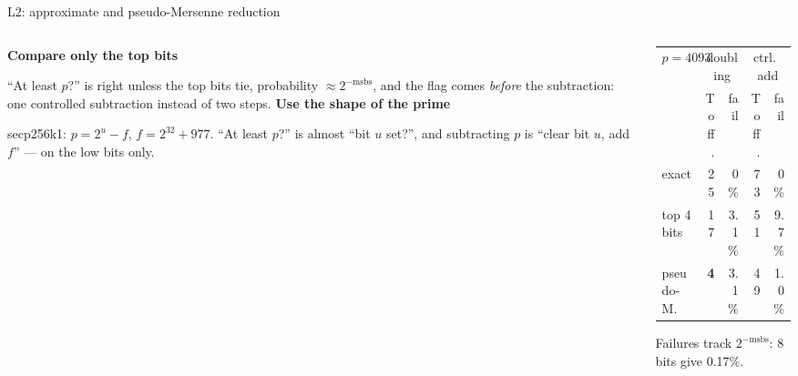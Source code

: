 \documentclass[aspectratio=169,11pt]{beamer}
\newcommand{\blocktitle}[1]{{\bfseries #1}\par\vskip1mm}
\begin{document}
\setcounter{framenumber}{82}
\begin{frame}{L2: approximate and pseudo-Mersenne reduction}
  \begin{columns}[T]
    \begin{column}{0.5\textwidth}
      \small
      \blocktitle{Compare only the top bits}
      ``At least $p$?'' is right unless the top bits tie, probability $\approx2^{-\text{msbs}}$, and the flag comes \emph{before} the subtraction: one controlled subtraction instead of two steps.
      \vskip2mm
      \blocktitle{Use the shape of the prime}
      secp256k1: $p=2^{u}-f$, $f=2^{32}+977$. ``At least $p$?'' is almost ``bit $u$ set?'', and subtracting $p$ is ``clear bit $u$, add $f$'' --- on the low bits only.
    \end{column}
    \begin{column}{0.46\textwidth}
      \centering
      \vskip2mm
      \footnotesize
      \renewcommand{\arraystretch}{1.08}
      \begin{tabular}{@{}lrrrr@{}}
        \toprule
        $p=4093$ & \multicolumn{2}{c}{doubling} & \multicolumn{2}{c}{ctrl.\ add} \\
        & Toff. & fail & Toff. & fail \\
        \midrule
        exact & 25 & 0\% & 73 & 0\% \\
        top 4 bits & 17 & 3.1\% & 51 & 9.7\% \\
        pseudo-M. & \textbf{4} & 3.1\% & 49 & 1.0\% \\
        \bottomrule
      \end{tabular}\par
      {\scriptsize Failures track $2^{-\text{msbs}}$: 8 bits give 0.17\%.}
    \end{column}
  \end{columns}
\end{frame}
\end{document}
